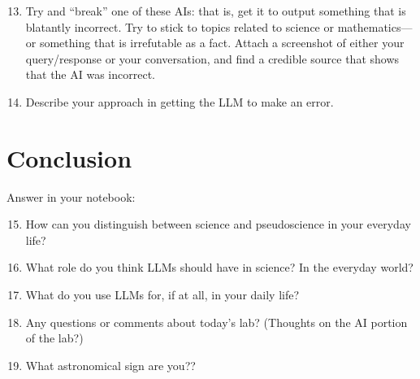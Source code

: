 \documentclass[12pt]{article}
\begin{document}
\begin{enumerate}
\setcounter{enumi}{12}
    \item Try and ``break'' one of these AIs: that is, get it to output something that is blatantly incorrect. Try to stick to topics related to science or mathematics--- or something that is irrefutable as a fact. Attach a screenshot of either your query/response or your conversation, and find a credible source that shows that the AI was incorrect.
    \item Describe your approach in getting the LLM to make an error.
\end{enumerate}



\section{Conclusion}

Answer in your notebook:
\begin{enumerate}
\setcounter{enumi}{14}
\item How can you distinguish between science and pseudoscience in your everyday life? 
\item What role do you think LLMs should have in science? In the everyday world?
\item What do you use LLMs for, if at all, in your daily life?

\item Any questions or comments about today's lab? (Thoughts on the AI portion of the lab?)
\item What astronomical sign are you??
\end{enumerate}
\end{document}

